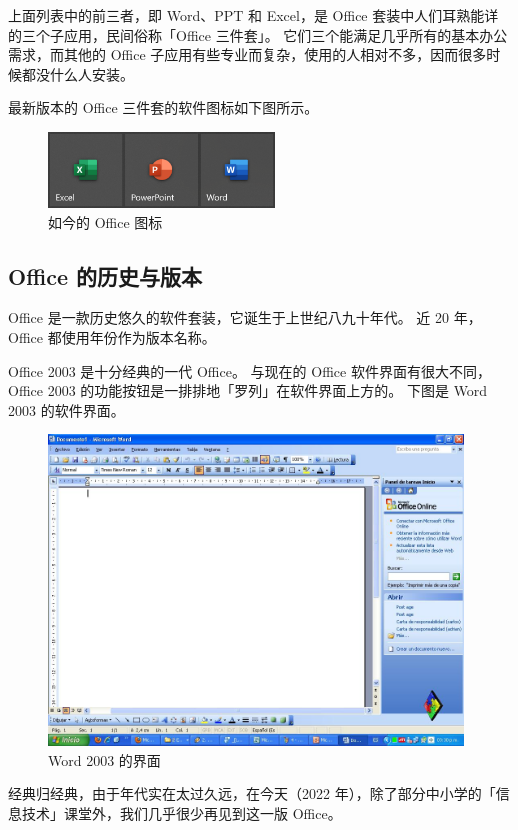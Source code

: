 上面列表中的前三者，即 Word、PPT 和 Excel，是 Office 套装中人们耳熟能详的三个子应用，民间俗称「Office 三件套」。
它们三个能满足几乎所有的基本办公需求，而其他的 Office 子应用有些专业而复杂，使用的人相对不多，因而很多时候都没什么人安装。

最新版本的 Office 三件套的软件图标如下图所示。

\begin{figure}[htb!]
  \centering
  \includegraphics[width=6cm]{assets/Office_Icons.png}
  \caption{如今的 Office 图标}
  \label{Office_Icons}
\end{figure}

\subsection{Office 的历史与版本}

Office 是一款历史悠久的软件套装，它诞生于上世纪八九十年代。
近 20 年，Office 都使用年份作为版本名称。

Office 2003 是十分经典的一代 Office。
与现在的 Office 软件界面有很大不同，Office 2003 的功能按钮是一排排地「罗列」在软件界面上方的。
下图是 Word 2003 的软件界面。

\begin{figure}[htb!]
  \centering
  \includegraphics[width=11cm]{assets/Word_2003.png}
  \caption{Word 2003 的界面}
  \label{Word_2003}
\end{figure}

经典归经典，由于年代实在太过久远，在今天（2022 年），除了部分中小学的「信息技术」课堂外，我们几乎很少再见到这一版 Office。


